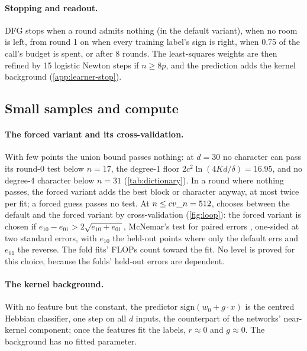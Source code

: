 \paragraph{Stopping and readout.} DFG stops when a round admits nothing (in the default variant), when no room is left, from round 1 on when every training label's sign is right, when 0.75 of the call's budget is spent, or after 8 rounds. The least-squares weights are then refined by 15 logistic Newton steps if $n\ge8p$, and the prediction adds the kernel background (\cref{app:learner-stop}).

\subsection{Small samples and compute}\label{sec:smalln}

\paragraph{The forced variant and its cross-validation.} With few points the union bound passes nothing: at $d=30$ no character can pass its round-0 test below $n=17$, the degree-1 floor $2c^2\ln(4Kd/\delta)=16.95$, and no degree-4 character below $n=31$ (\cref{tab:dictionary}). In a round where nothing passes, the forced variant adds the best block or character anyway, at most twice per fit; a forced guess passes no test. At $n\le\code{cv_n}=512$,  chooses between the default and the forced variant by cross-validation (\cref{fig:loop}): the forced variant is chosen if $e_{10}-e_{01}>2\sqrt{e_{10}+e_{01}}$, McNemar's test for paired errors \cite{mcnemar1947note}, one-sided at two standard errors, with $e_{10}$ the held-out points where only the default errs and $e_{01}$ the reverse. The fold fits' FLOPs count toward the fit. No level is proved for this choice, because the folds' held-out errors are dependent.

\paragraph{The kernel background.} With no feature but the constant, the predictor $\mathrm{sign}(w_0+g\cdot x)$ is the centred Hebbian classifier, one step on all $d$ inputs, the counterpart of the networks' near-kernel component; once the features fit the labels, $r\approx0$ and $g\approx0$. The background has no fitted parameter.

